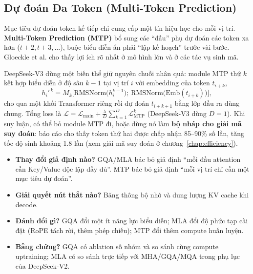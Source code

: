 \begin{center}
\label{fig:mla_comparison}
\end{center}

\subsection{Dự đoán Đa Token (Multi-Token Prediction)}
\label{ssec:mtp}

Mục tiêu dự đoán token kế tiếp chỉ cung cấp một tín hiệu học cho mỗi vị trí. \textbf{Multi-Token Prediction (MTP)} \cite{gloeckle2024mtp} bổ sung các “đầu” phụ dự đoán các token xa hơn ($t+2, t+3, \dots$), buộc biểu diễn ẩn phải “lập kế hoạch” trước vài bước. Gloeckle et al. cho thấy lợi ích rõ nhất ở mô hình lớn và ở các tác vụ sinh mã.

DeepSeek-V3 \cite{deepseekai2024v3} dùng một biến thể giữ nguyên chuỗi nhân quả: module MTP thứ $k$ kết hợp biểu diễn ở độ sâu $k-1$ tại vị trí $i$ với embedding của token $t_{i+k}$,
\[
h_i'^{\,k} = M_k\Big[\text{RMSNorm}\big(h_i^{k-1}\big);\ \text{RMSNorm}\big(\text{Emb}(t_{i+k})\big)\Big],
\]
cho qua một khối Transformer riêng rồi dự đoán $t_{i+k+1}$ bằng lớp đầu ra dùng chung. Tổng loss là $\mathcal{L} = \mathcal{L}_{\text{main}} + \frac{\lambda}{D}\sum_{k=1}^{D}\mathcal{L}^{k}_{\text{MTP}}$ (DeepSeek-V3 dùng $D = 1$). Khi suy luận, có thể bỏ module MTP đi, hoặc dùng nó làm \textbf{bộ nháp cho giải mã suy đoán}: báo cáo cho thấy token thứ hai được chấp nhận 85--90\% số lần, tăng tốc độ sinh khoảng 1.8 lần (xem giải mã suy đoán ở chương~\ref{chap:efficiency}).

\begin{tcolorbox}[title={Tổng kết: áp dụng bốn câu hỏi của danh sách đọc}, colback=green!5!white, colframe=green!60!black, fonttitle=\bfseries]
\begin{itemize}
	\item \textbf{Thay đổi giả định nào?} GQA/MLA bác bỏ giả định “mỗi đầu attention cần Key/Value độc lập đầy đủ”. MTP bác bỏ giả định “mỗi vị trí chỉ cần một mục tiêu dự đoán”.
	\item \textbf{Giải quyết nút thắt nào?} Băng thông bộ nhớ và dung lượng KV cache khi decode.
	\item \textbf{Đánh đổi gì?} GQA đổi một ít năng lực biểu diễn; MLA đổi độ phức tạp cài đặt (RoPE tách rời, thêm phép chiếu); MTP đổi thêm compute huấn luyện.
	\item \textbf{Bằng chứng?} GQA có ablation số nhóm và so sánh cùng compute uptraining; MLA có so sánh trực tiếp với MHA/GQA/MQA trong phụ lục của DeepSeek-V2.
\end{itemize}
\end{tcolorbox}

